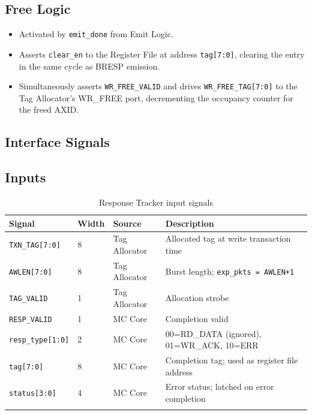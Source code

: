 \subsection{Free Logic}

\begin{itemize}
  \item Activated by \texttt{emit\_done} from Emit Logic.
  \item Asserts \texttt{clear\_en} to the Register File at address
        \texttt{tag[7:0]}, clearing the entry in the same cycle as
        BRESP emission.
  \item Simultaneously asserts \texttt{WR\_FREE\_VALID} and drives
        \texttt{WR\_FREE\_TAG[7:0]} to the Tag Allocator's WR\_FREE
        port, decrementing the occupancy counter for the freed AXID.
\end{itemize}

\subsection{Interface Signals}

\subsection{Inputs}

\begin{longtable}{p{3cm}p{1cm}p{3cm}p{7cm}}
\toprule
\textbf{Signal} & \textbf{Width} & \textbf{Source} & \textbf{Description} \\
\midrule
\texttt{TXN\_TAG[7:0]}     & 8 & Tag Allocator & Allocated tag at write transaction time \\
\texttt{AWLEN[7:0]}        & 8 & Tag Allocator & Burst length; \texttt{exp\_pkts = AWLEN+1} \\
\texttt{TAG\_VALID}        & 1 & Tag Allocator & Allocation strobe \\
\texttt{RESP\_VALID}       & 1 & MC Core       & Completion valid \\
\texttt{resp\_type[1:0]}   & 2 & MC Core       & 00=RD\_DATA (ignored), 01=WR\_ACK, 10=ERR \\
\texttt{tag[7:0]}          & 8 & MC Core       & Completion tag; used as register file address \\
\texttt{status[3:0]}       & 4 & MC Core       & Error status; latched on error completion \\
\bottomrule
\caption{Response Tracker input signals}
\end{longtable}

